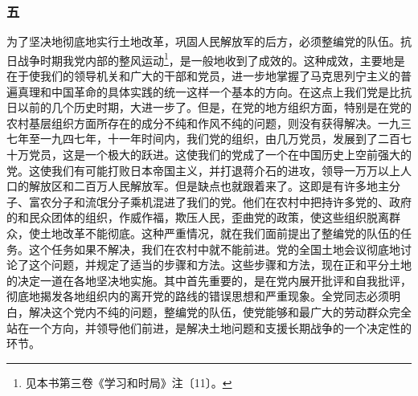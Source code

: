 \documentclass[cn,11pt,chinese]{elegantbook}
\def\myformat#1{\hfil\hfil #1}
\begin{document}
\subsubsection*{\myformat{五}}
为了坚决地彻底地实行土地改革，巩固人民解放军的后方，必须整编党的队伍。抗日战争时期我党内部的整风运动\footnote[11]{ 见本书第三卷《学习和时局》注〔11〕。}，是一般地收到了成效的。这种成效，主要地是在于使我们的领导机关和广大的干部和党员，进一步地掌握了马克思列宁主义的普遍真理和中国革命的具体实践的统一这样一个基本的方向。在这点上我们党是比抗日以前的几个历史时期，大进一步了。但是，在党的地方组织方面，特别是在党的农村基层组织方面所存在的成分不纯和作风不纯的问题，则没有获得解决。一九三七年至一九四七年，十一年时间内，我们党的组织，由几万党员，发展到了二百七十万党员，这是一个极大的跃进。这使我们的党成了一个在中国历史上空前强大的党。这使我们有可能打败日本帝国主义，并打退蒋介石的进攻，领导一万万以上人口的解放区和二百万人民解放军。但是缺点也就跟着来了。这即是有许多地主分子、富农分子和流氓分子乘机混进了我们的党。他们在农村中把持许多党的、政府的和民众团体的组织，作威作福，欺压人民，歪曲党的政策，使这些组织脱离群众，使土地改革不能彻底。这种严重情况，就在我们面前提出了整编党的队伍的任务。这个任务如果不解决，我们在农村中就不能前进。党的全国土地会议彻底地讨论了这个问题，并规定了适当的步骤和方法。这些步骤和方法，现在正和平分土地的决定一道在各地坚决地实施。其中首先重要的，是在党内展开批评和自我批评，彻底地揭发各地组织内的离开党的路线的错误思想和严重现象。全党同志必须明白，解决这个党内不纯的问题，整编党的队伍，使党能够和最广大的劳动群众完全站在一个方向，并领导他们前进，是解决土地问题和支援长期战争的一个决定性的环节。\\
\end{document}
